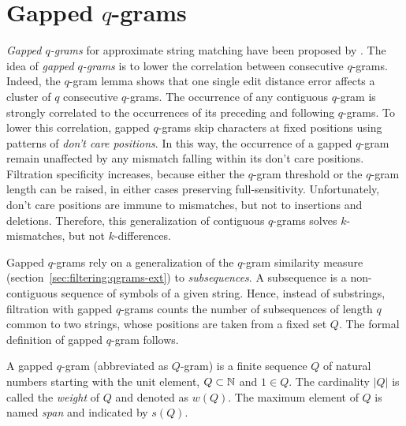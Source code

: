 
\section{Gapped $q$-grams}
\label{sec:filtering:qgrams-gapped}

\emph{Gapped $q$-grams} for approximate string matching have been proposed by \cite{Burkhardt2001}.
The idea of \emph{gapped $q$-grams} is to lower the correlation between consecutive $q$-grams.
Indeed, the $q$-gram lemma shows that one single edit distance error affects a cluster of $q$ consecutive $q$-grams.
The occurrence of any contiguous $q$-gram is strongly correlated to the occurrences of its preceding and following $q$-grams.
To lower this correlation, gapped $q$-grams skip characters at fixed positions using patterns of \emph{don't care positions}.
In this way, the occurrence of a gapped $q$-gram remain unaffected by any mismatch falling within its don't care positions.
Filtration specificity increases, because either the $q$-gram threshold or the $q$-gram length can be raised, in either cases preserving full-sensitivity.
Unfortunately, don't care positions are immune to mismatches, but not to insertions and deletions.
Therefore, this generalization of contiguous $q$-grams solves $k$-mismatches, but not $k$-differences.

Gapped $q$-grams rely on a generalization of the $q$-gram similarity measure (section~\ref{sec:filtering:qgrams-ext}) to \emph{subsequences}.
A subsequence is a non-contiguous sequence of symbols of a given string.
Hence, instead of substrings, filtration with gapped $q$-grams counts the number of subsequences of length $q$ common to two strings, whose positions are taken from a fixed set $Q$.
The formal definition of gapped $q$-gram follows.

\begin{definition}
A gapped $q$-gram (abbreviated as $Q$-gram) is a finite sequence $Q$ of natural numbers starting with the unit element, \ie $Q \subset \mathbb {N}$ and $1 \in Q$.
The cardinality $|Q|$ is called the \emph{weight} of $Q$ and denoted as $w(Q)$.
The maximum element of $Q$ is named \emph{span} and indicated by $s(Q)$.
\end{definition}

